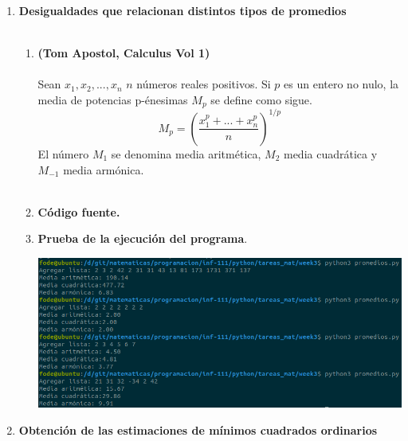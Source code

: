 \begin{enumerate}

\item \textbf{\large Desigualdades que relacionan distintos tipos de promedios}\\\\

    \begin{enumerate}[\bfseries a)]

	\item \textbf{(Tom Apostol, Calculus Vol 1)}\\\\ Sean $x_1,x_2,...,x_n$ $n$ números reales positivos. Si $p$ es un entero no nulo, la media de potencias p-énesimas $M_p$ se define como sigue.
$$M_p = \left( \dfrac{x_1^{p} + ... + x_{n}^{p}}{n} \right)^{1/p}$$
El número $M_1$ se denomina media aritmética, $M_2$ media cuadrática y $M_{-1}$ media armónica.\\\\

	\item \textbf{Código fuente.}\\ 
	    
	    
	    \vspace{.5cm}
	
	\item \textbf{Prueba de la ejecución del programa}.\\
	    \begin{center}
		\includegraphics[scale=.4]{imagenes/tareas_mat/week3/promedios.png}
	    \end{center}

    \end{enumerate}

\newpage

\item \textbf{\large Obtención de las estimaciones de mínimos cuadrados ordinarios}\\\\


\end{enumerate}
